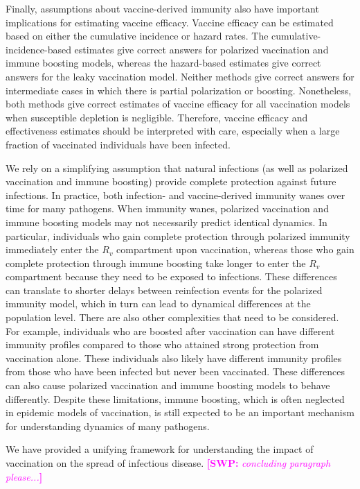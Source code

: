\documentclass[12pt]{article}
\newcommand{\comment}{\showcomment}
\newcommand{\showcomment}[3]{\textcolor{#1}{\textbf{[#2: }\textsl{#3}\textbf{]}}}
\newcommand{\swp}[1]{\comment{magenta}{SWP}{#1}}
\begin{document}
Finally, assumptions about vaccine-derived immunity also have important implications for estimating vaccine efficacy.
Vaccine efficacy can be estimated based on either the cumulative incidence or hazard rates.
The cumulative-incidence-based estimates give correct answers for polarized vaccination and immune boosting models,
whereas the hazard-based estimates give correct answers for the leaky vaccination model.
Neither methods give correct answers for intermediate cases in which there is partial polarization or boosting.
Nonetheless, both methods give correct estimates of vaccine efficacy for all vaccination models when susceptible depletion is negligible.
Therefore, vaccine efficacy and effectiveness estimates should be interpreted with care, especially when a large fraction of vaccinated individuals have been infected.

We rely on a simplifying assumption that natural infections (as well as polarized vaccination and immune boosting) provide complete protection against future infections.
In practice, both infection- and vaccine-derived immunity wanes over time for many pathogens.
When immunity wanes, polarized vaccination and immune boosting models may not necessarily predict identical dynamics.
In particular, individuals who gain complete protection through polarized immunity immediately enter the $R_v$ compartment upon vaccination, whereas those who gain complete protection through immune boosting take longer to enter the $R_v$ compartment because they need to be exposed to infections.
These differences can translate to shorter delays between reinfection events for the polarized immunity model, which in turn can lead to dynamical differences at the population level.
There are also other complexities that need to be considered.
For example, individuals who are boosted after vaccination can have different immunity profiles compared to those who attained strong protection from vaccination alone.
These individuals also likely have different immunity profiles from those who have been infected but never been vaccinated.
These differences can also cause polarized vaccination and immune boosting models to behave differently.
Despite these limitations, immune boosting, which is often neglected in epidemic models of vaccination, is still expected to be an important mechanism for understanding dynamics of many pathogens.

We have provided a unifying framework for understanding the impact of vaccination on the spread of infectious disease.
\swp{concluding paragraph please...}
\end{document}

